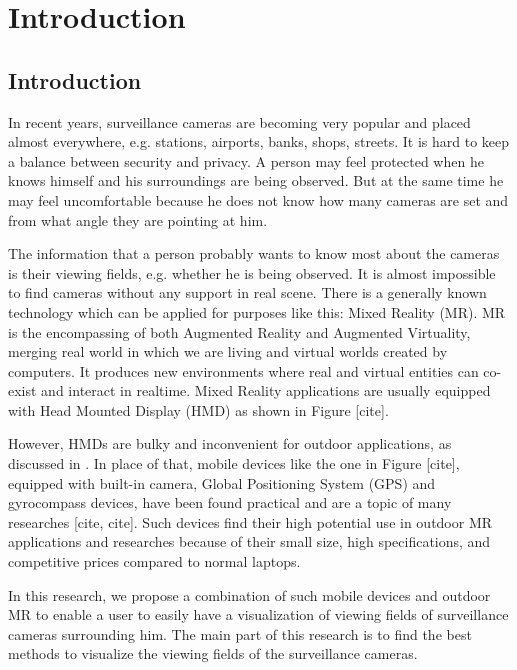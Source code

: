 \chapter{Introduction} %
\label{Chapter1}

\section{Introduction}

In recent years, surveillance cameras are becoming very popular and placed almost everywhere, e.g. stations, airports, banks, shops, streets. It is hard to keep a balance between security and privacy. A person may feel protected when he knows himself and his surroundings are being observed. But at the same time he may feel uncomfortable because he does not know how many cameras are set and from what angle they are pointing at him.

The information that a person probably wants to know most about the cameras is their viewing fields, e.g. whether he is being observed. It is almost impossible to find cameras without any support in real scene. There is a generally known technology which can be applied for purposes like this: Mixed Reality (MR). MR is the encompassing of both Augmented Reality and Augmented Virtuality, merging real world in which we are living and virtual worlds created by computers. It produces new environments where real and virtual entities can co-exist and interact in realtime. Mixed Reality applications are usually equipped with Head Mounted Display (HMD) as shown in Figure [cite].

However, HMDs are bulky and inconvenient for outdoor applications, as discussed in \citep{Reference2} \citep{Reference4}. In place of that, mobile devices like the one in Figure [cite], equipped with built-in camera, Global Positioning System (GPS) and gyrocompass devices, have been found practical and are a topic of many researches [cite, cite]. Such devices find their high potential use in outdoor MR applications and researches because of their small size, high specifications, and competitive prices compared to normal laptops.

In this research, we propose a combination of such mobile devices and outdoor MR to enable a user to easily have a visualization of viewing fields of surveillance cameras surrounding him. The main part of this research is to find the best methods to visualize the viewing fields of the surveillance cameras.

